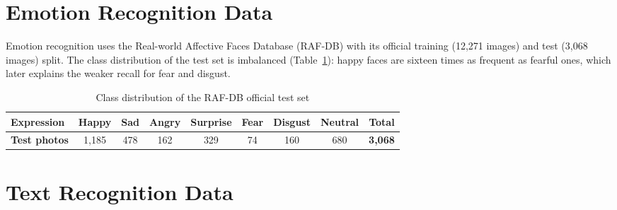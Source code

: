 \section{Emotion Recognition Data}
Emotion recognition uses the Real-world Affective Faces Database (RAF-DB) \cite{rafdb} with its official training (12,271 images) and test (3,068 images) split. The class distribution of the test set is imbalanced (Table~\ref{tab:rafdb}): happy faces are sixteen times as frequent as fearful ones, which later explains the weaker recall for fear and disgust.

\begin{table}[!htbp]
\centering
\caption{Class distribution of the RAF-DB official test set}
\label{tab:rafdb}
\begin{tabular}{|l|c|c|c|c|c|c|c|c|}
\hline
\textbf{Expression} & Happy & Sad & Angry & Surprise & Fear & Disgust & Neutral & \textbf{Total} \\ \hline
\textbf{Test photos} & 1,185 & 478 & 162 & 329 & 74 & 160 & 680 & \textbf{3,068} \\ \hline
\end{tabular}
\end{table}

\section{Text Recognition Data}
